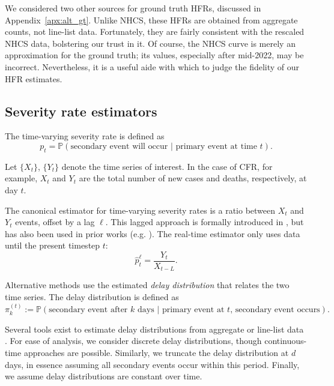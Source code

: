 \documentclass{article}
\begin{document}
We considered two other sources for ground truth HFRs, discussed in Appendix~\ref{apx:alt_gt}. Unlike NHCS, these HFRs are obtained from aggregate counts, not line-list data. Fortunately, they are fairly consistent with the rescaled NHCS data, bolstering our trust in it. Of course, the NHCS curve is merely an approximation for the ground truth; its values, especially after mid-2022, may be incorrect. Nevertheless, it is a useful aide with which to judge the fidelity of our HFR estimates.

\subsection{Severity rate estimators}\label{sec:defs}

The time-varying severity rate is defined as
\begin{equation}\label{eq:severity}
    p_t = \mathbb{P}(\text{secondary event will occur } \vert \text{ primary event at time }t).
\end{equation}

Let $\{X_t\}$, $\{Y_t\}$ denote the time series of interest. In the case of CFR, for example, $X_t$ and $Y_t$ are the total number of new cases and deaths, respectively, at day $t$. 

The canonical estimator for time-varying severity rates is a ratio between $X_t$ and $Y_t$ events, offset by a lag $\ell$. This lagged approach is formally introduced in \citet{thomas2021estimating}, but has also been used in prior works (e.g. \citealp{germany,horita2022global,timevar_ifr,yuan2020monitoring,LIU2023100350,atlantic,wsj}). The real-time estimator only uses data until the present timestep $t$: 
\begin{equation}\label{eq:lagged}
    \hat{p}_t^\ell = \frac{Y_t}{X_{t-L}}.
\end{equation}

Alternative methods use the estimated \textit{delay distribution} that relates the two time series. The delay distribution is defined as
\begin{equation*}
    \pi_k^{(t)} := \mathbb{P}(\text{secondary event after $k$ days }\vert\text{ primary event at $t$, secondary event occurs}).
\end{equation*}

\noindent Several tools exist to estimate delay distributions from aggregate or line-list data \citep{delay_distrs}. For ease of analysis, we consider discrete delay distributions, though continuous-time approaches are possible. Similarly, we truncate the delay distribution at $d$ days, in essence assuming all secondary events occur within this period. Finally, we assume delay distributions are constant over time.
\end{document}
